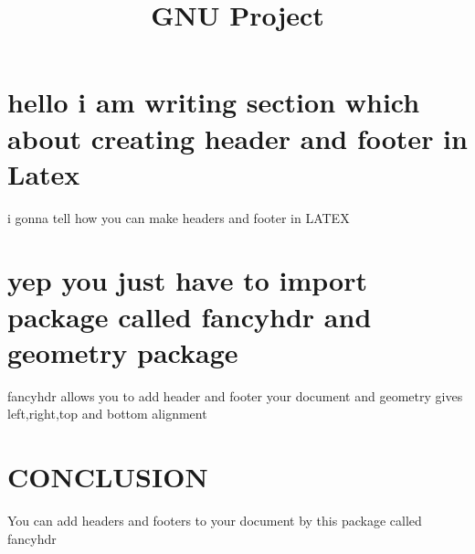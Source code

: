 \documentclass[12pt,a4paper]{article}
\begin{document}
\pagestyle{fancy}

\fancyhf{}
\fancyhead{}
\fancyhead[R]{\thepage}
\fancyfoot{}
\title{GNU Project}
\maketitle
\section {hello i am writing section which about creating header and footer in Latex}
i gonna tell how you can make headers and footer in LATEX

\section {yep you just have to import package called fancyhdr and geometry package }
fancyhdr allows you to add header and footer your document and geometry gives left,right,top and bottom alignment
\section{CONCLUSION}
You can add headers and footers to your document by this package called fancyhdr
\end{document}
